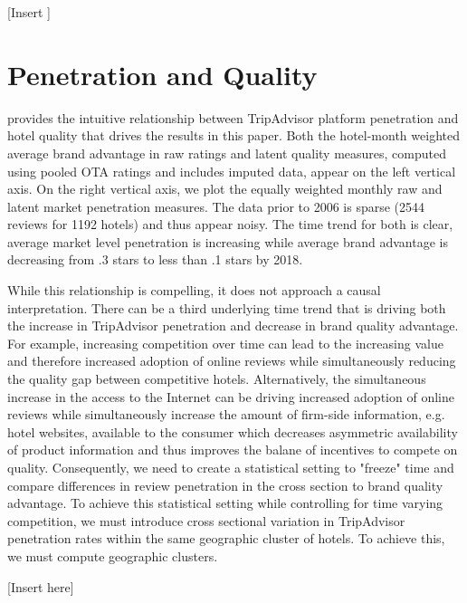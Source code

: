 \documentclass[mksc,blindrev]{informs3} %
\begin{document}
[Insert ]


\section{Penetration and Quality} \label{sec:mainstudy}

 provides the intuitive relationship between TripAdvisor platform penetration and hotel quality that drives the results in this paper. Both the hotel-month weighted average brand advantage in raw ratings and latent quality measures, computed using pooled OTA ratings and includes imputed data, appear on the left vertical axis. On the right vertical axis, we plot the equally weighted monthly raw and latent market penetration measures. The data prior to 2006 is sparse (2544 reviews for 1192 hotels) and thus appear noisy. The time trend for both is clear, average market level penetration is increasing while average brand advantage is decreasing from .3 stars to less than .1 stars by 2018. 

While this relationship is compelling, it does not approach a causal interpretation. There can be a third underlying time trend that is driving both the increase in TripAdvisor penetration and decrease in brand quality advantage. For example, increasing competition over time can lead to the increasing value and therefore increased adoption of online reviews while simultaneously reducing the quality gap between competitive hotels. Alternatively, the simultaneous increase in the access to the Internet can be driving increased adoption of online reviews while simultaneously increase the amount of firm-side information, e.g. hotel websites, available to the consumer which decreases asymmetric availability of product information and thus improves the balane of incentives to compete on quality. Consequently, we need to create a statistical setting to "freeze" time and compare differences in review penetration in the cross section to brand quality advantage. To achieve this statistical setting while controlling for time varying competition, we must introduce cross sectional variation in TripAdvisor penetration rates within the same geographic cluster of hotels. To achieve this, we must compute geographic clusters.

[Insert  here]

\end{document}
